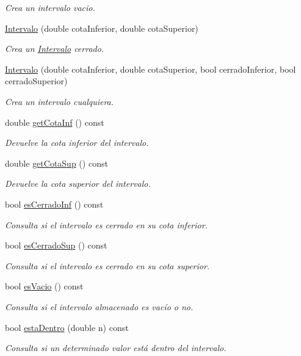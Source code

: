 \begin{DoxyCompactItemize}
\begin{DoxyCompactList}\small\item\em Crea un intervalo vacio. \end{DoxyCompactList}\item 
\hyperlink{classIntervalo_a321e56ef7e1f4a774bd64cc2609156f4}{Intervalo} (double cota\+Inferior, double cota\+Superior)
\begin{DoxyCompactList}\small\item\em Crea un \hyperlink{classIntervalo}{Intervalo} cerrado. \end{DoxyCompactList}\item 
\hyperlink{classIntervalo_af70d523399465f51862977a303656c72}{Intervalo} (double cota\+Inferior, double cota\+Superior, bool cerrado\+Inferior, bool cerrado\+Superior)
\begin{DoxyCompactList}\small\item\em Crea un intervalo cualquiera. \end{DoxyCompactList}\item 
double \hyperlink{classIntervalo_af8170b68c6d6a63192db6685b90f782f}{get\+Cota\+Inf} () const 
\begin{DoxyCompactList}\small\item\em Devuelve la cota inferior del intervalo. \end{DoxyCompactList}\item 
double \hyperlink{classIntervalo_a7f8ff94ce16f90a81a3c55f36044893b}{get\+Cota\+Sup} () const 
\begin{DoxyCompactList}\small\item\em Devuelve la cota superior del intervalo. \end{DoxyCompactList}\item 
bool \hyperlink{classIntervalo_a6737cfbda201a3a6e11a716d2568d322}{es\+Cerrado\+Inf} () const 
\begin{DoxyCompactList}\small\item\em Consulta si el intervalo es cerrado en su cota inferior. \end{DoxyCompactList}\item 
bool \hyperlink{classIntervalo_ad0c5573ee88ffbfda8f78454b78d91a6}{es\+Cerrado\+Sup} () const 
\begin{DoxyCompactList}\small\item\em Consulta si el intervalo es cerrado en su cota superior. \end{DoxyCompactList}\item 
bool \hyperlink{classIntervalo_ab53adad27de8ec98cf8f4280bd3a7df9}{es\+Vacio} () const 
\begin{DoxyCompactList}\small\item\em Consulta si el intervalo almacenado es vacío o no. \end{DoxyCompactList}\item 
bool \hyperlink{classIntervalo_af55ac0bb47855ef909402e2ec76cda5b}{esta\+Dentro} (double n) const 
\begin{DoxyCompactList}\small\item\em Consulta si un determinado valor está dentro del intervalo. \end{DoxyCompactList}\end{DoxyCompactItemize}


